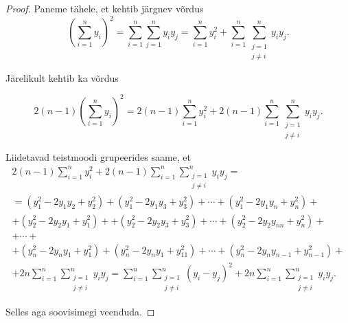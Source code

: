 \documentclass[a4paper,12pt,oneside]{article}
\numberwithin{equation}{section}
\theoremstyle{definition}
\begin{document}
\begin{proof}

Paneme tähele, et kehtib järgnev võrdus
\begin{equation*}
\left( \sum \limits_{i=1}^n y_{i} \right)^2 = \sum \limits_{i=1}^n \sum \limits_{j=1}^n y_{i} y_{j} =   \sum \limits_{i=1}^n y_{i}^2 + \sum \limits_{i=1}^n   \sum \limits_{\substack{j=1 \\ j \neq i}}^{n} y_{i} y_{j}  \text{.}
\end{equation*}

Järelikult kehtib ka võrdus

\begin{equation*}
2 \left( n-1 \right) \left( \sum \limits_{i=1}^n y_{i} \right)^2 =  2 \left( n-1 \right) \sum \limits_{i=1}^n y_{i}^2  + 2 \left( n-1 \right) \sum \limits_{i=1}^n   \sum \limits_{\substack{j=1 \\ j \neq i}}^{n} y_{i} y_{j}  \text{.}
\end{equation*}

Liidetavad teistmoodi grupeerides saame, et
\begin{equation*}
\begin{gathered}
2 \left( n-1 \right) \sum \limits_{i=1}^n y_{i}^2  + 2 \left( n-1 \right) \sum \limits_{i=1}^n  \sum \limits_{\substack{j=1 \\ j \neq i}}^{n} y_{i} y_{j}  = \\
= \left( y_{1}^2 - 2 y_{1} y_{2} + y_{2}^2 \right) + \left( y_{1}^2 - 2 y_{1} y_{3} + y_{3}^2 \right) + \cdots +\left( y_{1}^2 - 2 y_{1} y_{n} + y_{n}^2 \right) + \\
+ \left( y_{2}^2 - 2 y_{2} y_{1} + y_{1}^2 \right) + 
 +  \left( y_{2}^2 - 2 y_{2} y_{3} + y_{3}^2 \right) + \cdots + \left( y_{2}^2 - 2 y_{2} y_{nn} + y_{n}^2 \right) + \\
 + \cdots + \\
 + \left( y_{n}^2 - 2 y_{n} y_{1} + y_{1}^2 \right) + \left( y_{n}^2 - 2 y_{n} y_{1} + y_{11}^2 \right) + \cdots + \left( y_{n}^2 - 2 y_{n} y_{n-1} + y_{n-1}^2 \right) + \\
 + 2 n \sum \limits_{i=1}^n   \sum \limits_{\substack{j=1 \\ j \neq i}}^{n} y_{i} y_{j}  =
 \sum \limits_{i=1}^n   \sum \limits_{\substack{j=1 \\ j \neq i}}^{n} (y_{i} - y_{j})^2  +  2 n \sum \limits_{i=1}^n   \sum \limits_{\substack{j=1 \\ j \neq i}}^{n} y_{i} y_{j} \text{.}
\end{gathered}
\end{equation*}

Selles aga soovisimegi veenduda.

\end{proof}
\end{document}
